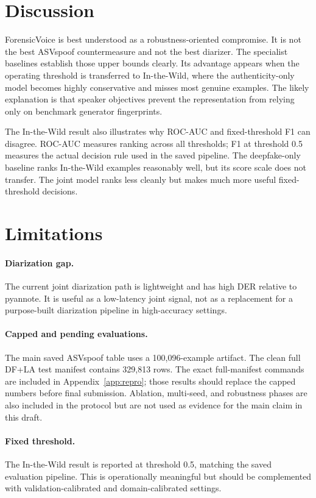 \documentclass{article}
\newcommand{\fv}{ForensicVoice}
\newcommand{\der}{DER}
\newcommand{\asv}{ASVspoof}
\newcommand{\itw}{In-the-Wild}
\begin{document}
\section{Discussion}

\fv{} is best understood as a robustness-oriented compromise.  It is not the
best \asv{} countermeasure and not the best diarizer.  The specialist baselines
establish those upper bounds clearly.  Its advantage appears when the operating
threshold is transferred to \itw{}, where the authenticity-only model becomes
highly conservative and misses most genuine examples.  The likely explanation
is that speaker objectives prevent the representation from relying only on
benchmark generator fingerprints.

The \itw{} result also illustrates why ROC-AUC and fixed-threshold F1 can
disagree.  ROC-AUC measures ranking across all thresholds; F1 at threshold 0.5
measures the actual decision rule used in the saved pipeline.  The deepfake-only
baseline ranks \itw{} examples reasonably well, but its score scale does not
transfer.  The joint model ranks less cleanly but makes much more useful
fixed-threshold decisions.

\section{Limitations}

\paragraph{Diarization gap.}
The current joint diarization path is lightweight and has high \der{} relative
to pyannote.  It is useful as a low-latency joint signal, not as a replacement
for a purpose-built diarization pipeline in high-accuracy settings.

\paragraph{Capped and pending evaluations.}
The main saved \asv{} table uses a 100,096-example artifact.  The clean full
DF+LA test manifest contains 329,813 rows.  The exact full-manifest commands are
included in Appendix~\ref{app:repro}; those results should replace the capped
numbers before final submission.  Ablation, multi-seed, and robustness phases
are also included in the protocol but are not used as evidence for the main
claim in this draft.

\paragraph{Fixed threshold.}
The \itw{} result is reported at threshold 0.5, matching the saved evaluation
pipeline.  This is operationally meaningful but should be complemented with
validation-calibrated and domain-calibrated settings.
\end{document}
